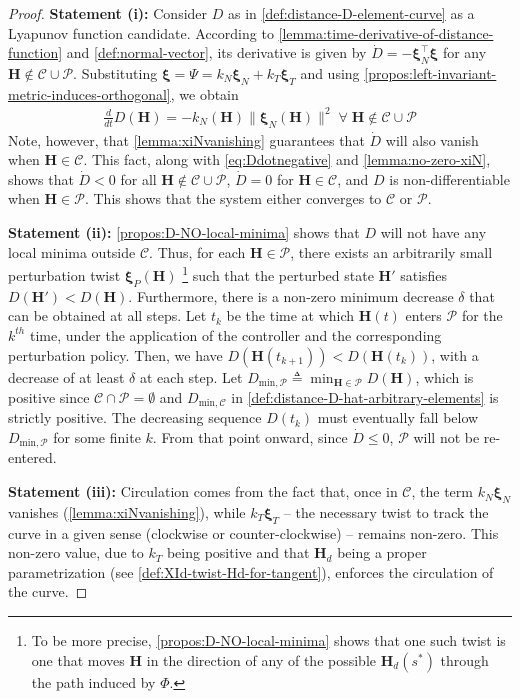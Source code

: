 \begin{proof}
    \textbf{Statement (i):} Consider $D$ as in \cref{def:distance-D-element-curve} as a Lyapunov function candidate. According to \cref{lemma:time-derivative-of-distance-function} and \cref{def:normal-vector}, its derivative is given by $\dot{D} = -\boldsymbol{\xi}_N^{\top}\boldsymbol{\xi} $ for any $\mathbf{H} \notin \mathcal{C} \cup \mathcal{P}$. Substituting $\boldsymbol{\xi}=\Psi=k_N\boldsymbol{\xi}_N+k_T\boldsymbol{\xi}_T$ and using \cref{propos:left-invariant-metric-induces-orthogonal}, we obtain 
\begin{align}
\label{eq:Ddotnegative}
    \frac{d}{dt}D(\mathbf{H})= -k_N(\mathbf{H})\|\boldsymbol{\xi}_N(\mathbf{H})\|^2 \;\forall\;\mathbf{H} \notin \mathcal{C} \cup \mathcal{P}
\end{align}
Note, however, that \cref{lemma:xiNvanishing} guarantees that $\dot{D}$ will also vanish when $\mathbf{H} \in \mathcal{C}$. This fact, along with \eqref{eq:Ddotnegative} and \cref{lemma:no-zero-xiN}, shows that $\dot{D} < 0$ for all $\mathbf{H} \not \in \mathcal{C} \cup \mathcal{P}$, $\dot{D} = 0$ for $\mathbf{H} \in \mathcal{C}$, and $D$ is non-differentiable when $\mathbf{H} \in \mathcal{P}$. This shows that the system either converges to $\mathcal{C}$ or $\mathcal{P}$.

\textbf{Statement (ii):} \cref{propos:D-NO-local-minima} shows that $D$ will not have any local minima outside $\mathcal{C}$. Thus, for each $\mathbf{H} \in \mathcal{P}$, there exists an arbitrarily small perturbation twist $\boldsymbol{\xi}_P(\mathbf{H})$ \footnote{To be more precise, \cref{propos:D-NO-local-minima} shows that one such twist is one that moves $\mathbf{H}$ in the direction of any of the possible $\mathbf{H}_d(s^*)$ through the path induced by $\Phi$.} such that the perturbed state $\mathbf{H}'$ satisfies $D(\mathbf{H}') < D(\mathbf{H})$. Furthermore, there is a non-zero minimum decrease $\delta$ that can be obtained at all steps. Let $t_k$ be the time at which $\mathbf{H}(t)$ enters $\mathcal{P}$ for the $k^{th}$ time, under the application of the controller and the corresponding perturbation policy. Then, we have $D(\mathbf{H}(t_{k+1})) < D(\mathbf{H}(t_k))$, with a decrease of at least $\delta$ at each step. Let $D_{\text{min}, \mathcal{P}} \triangleq \min_{\mathbf{H} \in \mathcal{P}} D(\mathbf{H})$, which is positive since $\mathcal{C} \cap \mathcal{P} = \emptyset$ and $D_{\text{min},\mathcal{C}}$ in \cref{def:distance-D-hat-arbitrary-elements} is strictly positive. The decreasing sequence $D(t_k)$ must eventually fall below $D_{\text{min}, \mathcal{P}}$ for some finite $k$. From that point onward, since $\dot{D} \leq 0$, $\mathcal{P}$ will not be re-entered.

\textbf{Statement (iii):} Circulation comes from the fact that, once in $\mathcal{C}$, the term $k_N \boldsymbol{\xi}_N$ vanishes (\cref{lemma:xiNvanishing}), while $k_T \boldsymbol{\xi}_T$ -- the necessary twist to track the curve in a given sense (clockwise or counter-clockwise) -- remains non-zero. This non-zero value, due to $k_T$ being positive and that $\mathbf{H}_d$ being a proper parametrization (see \cref{def:XId-twist-Hd-for-tangent}), enforces the circulation of the curve.

\end{proof} 
